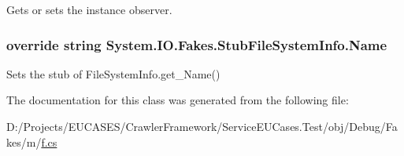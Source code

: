 Gets or sets the instance observer.

\hypertarget{class_system_1_1_i_o_1_1_fakes_1_1_stub_file_system_info_a785343755d311dbac65ea546785ae4ff}{
\subsubsection[{Name}]{\setlength{\rightskip}{0pt plus 5cm}override string System.\-I\-O.\-Fakes.\-Stub\-File\-System\-Info.\-Name\hspace{0.3cm}{\ttfamily [get]}}}\label{class_system_1_1_i_o_1_1_fakes_1_1_stub_file_system_info_a785343755d311dbac65ea546785ae4ff}


Sets the stub of File\-System\-Info.\-get\-\_\-\-Name()



The documentation for this class was generated from the following file\-:\begin{DoxyCompactItemize}
\item 
D\-:/\-Projects/\-E\-U\-C\-A\-S\-E\-S/\-Crawler\-Framework/\-Service\-E\-U\-Cases.\-Test/obj/\-Debug/\-Fakes/m/\hyperlink{m_2f_8cs}{f.\-cs}\end{DoxyCompactItemize}
